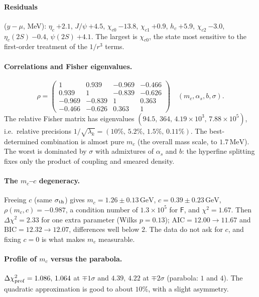 \documentclass[11pt,a4paper]{article}
\numberwithin{equation}{section}
\theoremstyle{definition}
\theoremstyle{plain}
\theoremstyle{remark}
\numberwithin{algorithm}{section}
\newcommand{\as}{\alpha_s}
\newcommand{\GeV}{\,\mathrm{GeV}}
\newcommand{\MeV}{\,\mathrm{MeV}}
\newcommand{\sF}{\mathsf F}
\begin{document}
\paragraph{Residuals} ($y-\mu$, MeV): $\eta_c\ {+2.1}$, $J/\psi\ {+4.5}$, $\chi_{c0}\ {-13.8}$, $\chi_{c1}\ {+0.9}$, $h_c\ {+5.9}$, $\chi_{c2}\ {-3.0}$, $\eta_c(2S)\ {-0.4}$, $\psi(2S)\ {+4.1}$. The largest is $\chi_{c0}$, the state most sensitive to the first-order treatment of the $1/r^3$ terms.

\paragraph{Correlations and Fisher eigenvalues.}
\[
\rho=\begin{pmatrix}1&0.939&-0.969&-0.466\\ 0.939&1&-0.839&-0.626\\ -0.969&-0.839&1&0.363\\ -0.466&-0.626&0.363&1\end{pmatrix}\quad(m_c,\as,b,\sigma).
\]
The relative Fisher matrix has eigenvalues $(94.5,\,364,\,4.19\times10^3,\,7.88\times10^5)$, i.e.\ relative precisions $1/\sqrt{\lambda_k}=(10\%,\,5.2\%,\,1.5\%,\,0.11\%)$. The best-determined combination is almost pure $m_c$ (the overall mass scale, to $1.7\MeV$). The worst is dominated by $\sigma$ with admixtures of $\as$ and $b$: the hyperfine splitting fixes only the product of coupling and smeared density.

\paragraph{The $m_c$--$c$ degeneracy.} Freeing $c$ (same $\sigma_{\rm th}$) gives $m_c=1.26\pm0.13\GeV$, $c=0.39\pm0.23\GeV$, $\rho(m_c,c)=-0.987$, a condition number of $1.3\times10^5$ for $\sF$, and $\chi^2=1.67$. Then $\Delta\chi^2=2.33$ for one extra parameter (Wilks $p=0.13$); $\mathrm{AIC}=12.00\to11.67$ and $\mathrm{BIC}=12.32\to12.07$, differences well below 2. The data do not ask for $c$, and fixing $c=0$ is what makes $m_c$ measurable.

\paragraph{Profile of $m_c$ versus the parabola.} $\Delta\chi^2_{\rm prof}=1.086,\,1.064$ at $\mp1\sigma$ and $4.39,\,4.22$ at $\mp2\sigma$ (parabola: $1$ and $4$). The quadratic approximation is good to about $10\%$, with a slight asymmetry.
\end{document}

